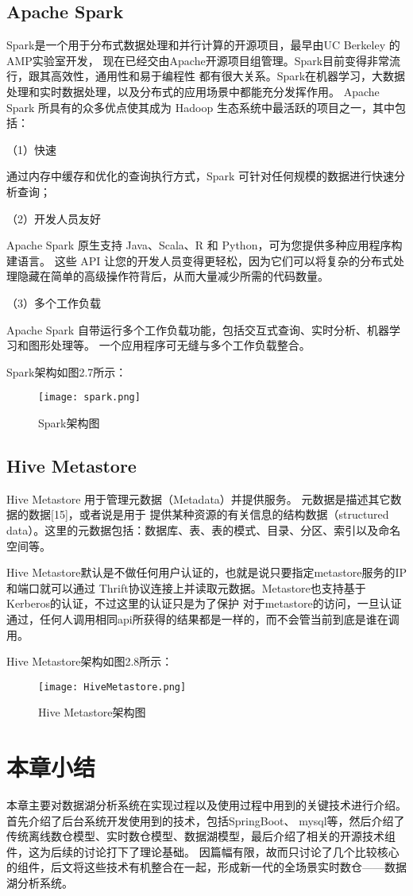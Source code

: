 \subsection{Apache Spark}

Spark是一个用于分布式数据处理和并行计算的开源项目，最早由UC Berkeley 的AMP实验室开发，
现在已经交由Apache开源项目组管理。Spark目前变得非常流行，跟其高效性，通用性和易于编程性
都有很大关系。Spark在机器学习，大数据处理和实时数据处理，以及分布式的应用场景中都能充分发挥作用。
Apache Spark 所具有的众多优点使其成为 Hadoop 生态系统中最活跃的项目之一，其中包括：

（1）快速

通过内存中缓存和优化的查询执行方式，Spark 可针对任何规模的数据进行快速分析查询；

（2）开发人员友好

Apache Spark 原生支持 Java、Scala、R 和 Python，可为您提供多种应用程序构建语言。
这些 API 让您的开发人员变得更轻松，因为它们可以将复杂的分布式处理隐藏在简单的高级操作符背后，从而大量减少所需的代码数量。

（3）多个工作负载

Apache Spark 自带运行多个工作负载功能，包括交互式查询、实时分析、机器学习和图形处理等。
一个应用程序可无缝与多个工作负载整合。

Spark架构如图2.7所示：

\begin{figure}[h]
  \centering
  \texttt{[image: spark.png]}
  \caption{Spark架构图}
  \label{fig:badge}
\end{figure}

\subsection{Hive Metastore}

Hive Metastore 用于管理元数据（Metadata）并提供服务。 元数据是描述其它数据的数据[15]，或者说是用于
提供某种资源的有关信息的结构数据（structured data）。这里的元数据包括：数据库、表、表的模式、目录、分区、索引以及命名空间等。

Hive Metastore默认是不做任何用户认证的，也就是说只要指定metastore服务的IP和端口就可以通过
Thrift协议连接上并读取元数据。Metastore也支持基于Kerberos的认证，不过这里的认证只是为了保护
对于metastore的访问，一旦认证通过，任何人调用相同api所获得的结果都是一样的，而不会管当前到底是谁在调用。

Hive Metastore架构如图2.8所示：

\begin{figure}[h]
  \centering
  \texttt{[image: HiveMetastore.png]}
  \caption{Hive Metastore架构图}
  \label{fig:badge}
\end{figure}

\section{本章小结}

本章主要对数据湖分析系统在实现过程以及使用过程中用到的关键技术进行介绍。首先介绍了后台系统开发使用到的技术，包括SpringBoot、
mysql等，然后介绍了传统离线数仓模型、实时数仓模型、数据湖模型，最后介绍了相关的开源技术组件，这为后续的讨论打下了理论基础。
因篇幅有限，故而只讨论了几个比较核心的组件，后文将这些技术有机整合在一起，形成新一代的全场景实时数仓——数据湖分析系统。

